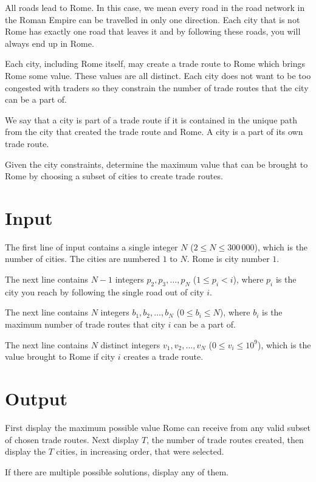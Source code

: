 
All roads lead to Rome. In this case, we mean every road in the road network
in the Roman Empire can be travelled in only one direction. Each city that
is not Rome has exactly one road that leaves it and by following these roads,
you will always end up in Rome.

Each city, including Rome itself, may create a trade route to Rome which
brings Rome some value. These values are all distinct. Each city does not
want to be too congested with traders so they constrain the number of
trade routes that the city can be a part of.

We say that a city is part of a trade route if it is contained in the
unique path from the city that created the trade route and Rome.
A city is a part of its own trade route.

Given the city constraints, determine the maximum value that can be brought
to Rome by choosing a subset of cities to create trade routes.

\section*{Input}
The first line of input contains a single integer $N$
($2 \leq N \leq 300\,000$), which is the number of cities. The cities are
numbered $1$ to $N$. Rome is city number $1$.

The next line contains $N-1$ integers $p_2, p_3, \ldots, p_{N}$
($1 \leq p_i < i$), where $p_i$ is the city you reach by
following the single road out of city $i$.

The next line contains $N$ integers $b_1, b_2, \ldots, b_{N}$
($0 \leq b_i \leq N$), where $b_i$ is the maximum number of trade routes
that city $i$ can be a part of.

The next line contains $N$ distinct integers $v_1, v_2, \ldots, v_N$
($0 \leq v_i \leq 10^9$), which is the value brought to Rome if city $i$
creates a trade route.

\section*{Output}
First display the maximum possible value Rome can receive from any valid
subset of chosen trade routes. Next display $T$, the number of trade routes
created, then display the $T$ cities, in increasing order, that were selected.

If there are multiple possible solutions, display any of them.
